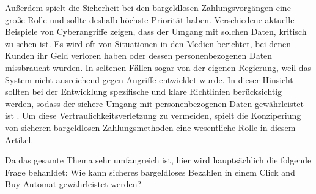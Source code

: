 Außerdem spielt die Sicherheit bei den bargeldlosen Zahlungsvorgängen eine große Rolle und sollte
deshalb höchste Priorität haben. Verschiedene aktuelle Beispiele von Cyberangriffe zeigen, dass der 
Umgang mit solchen Daten, kritisch zu sehen ist. Es wird oft von Situationen in den Medien berichtet,
bei denen Kunden ihr Geld verloren haben oder dessen personenbezogenen Daten missbraucht wurden. 
In seltenen Fällen sogar von der eigenen Regierung, weil das System nicht ausreichend gegen Angriffe 
entwicklet wurde. In dieser Hinsicht sollten bei der Entwicklung spezifische und klare Richtlinien 
berücksichtig werden, sodass der sichere Umgang mit personenbezogenen Daten gewährleistet ist 
\cite{refart:TRVR}. Um diese Vertraulichkeitsverletzung zu vermeiden, spielt die Konziperiung von 
sicheren bargeldlosen Zahlungsmethoden eine wesentliche Rolle in diesem Artikel. 

Da das gesamte Thema sehr umfangreich ist, hier wird hauptsächlich die folgende Frage behanldet: 
Wie kann sicheres bargeldloses Bezahlen in einem Click and Buy Automat gewährleistet werden?